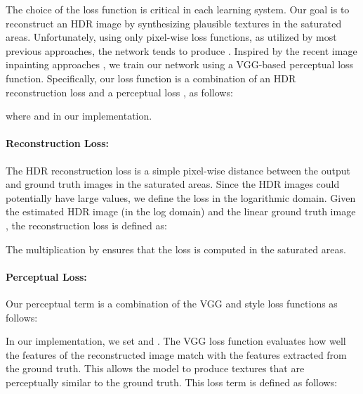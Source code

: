 The choice of the loss function is critical in each learning system. Our goal is to reconstruct an HDR image by synthesizing plausible textures in the saturated areas. Unfortunately, using only pixel-wise loss functions, as utilized by most previous approaches, the network tends to produce . Inspired by the recent image inpainting approaches \cite{yang2017high, liu2018image, han2019finet}, we train our network using a VGG-based perceptual loss function. Specifically, our loss function is a combination of an HDR reconstruction loss  and a perceptual loss , as follows:

\vspace{-6pt}

\vspace{-10pt}

\noindent where  and  in our implementation. 
\paragraph{Reconstruction Loss:} The HDR reconstruction loss is a simple pixel-wise  distance between the output and ground truth images in the saturated areas. Since the HDR images could potentially have large values, we define the loss in the logarithmic domain. Given the estimated HDR image  (in the log domain) and the  linear ground truth image , the reconstruction loss is defined as:

\vspace{-8pt}

\vspace{-8pt}

\noindent The multiplication by  ensures that the loss is computed in the saturated areas.

\paragraph{Perceptual Loss:} Our perceptual term is a combination of the VGG and style loss functions as follows:

\vspace{-8pt}

\vspace{-10pt}

In our implementation, we set  and  . The VGG loss function  evaluates how well the features of the reconstructed image match with the features extracted from the ground truth. This allows the model to produce textures that are perceptually similar to the ground truth. This loss term is defined as follows:


